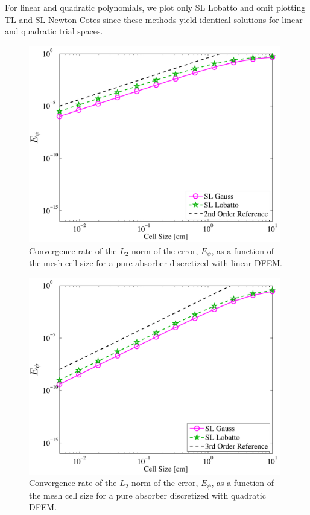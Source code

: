 For linear and quadratic polynomials, we plot only SL Lobatto and omit plotting TL and SL Newton-Cotes since these methods yield identical solutions for linear and quadratic trial spaces.  
\begin{figure}[!htp]
\centering
\includegraphics[width=11cm]{chapter2_constant_xs/Linear_L2_err-eps-converted-to.pdf}
\caption{Convergence rate of the $L_2$ norm of the error, $E_{\psi}$,  as a function of the mesh cell size for a pure absorber discretized with linear DFEM.}
\label{fig:multi_L2_p1}
\end{figure}
\begin{figure}[!htp]
\centering
\includegraphics[width=11cm]{chapter2_constant_xs/Quadratic_L2_err-eps-converted-to.pdf}
\caption{Convergence rate of the $L_2$ norm of the error, $E_{\psi}$,  as a function of the mesh cell size for a pure absorber discretized with quadratic DFEM.}
\label{fig:multi_L2_p2}
\end{figure}
